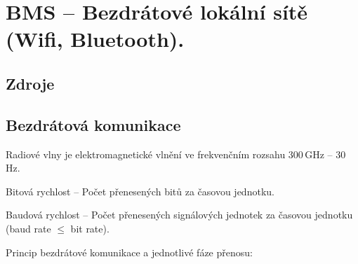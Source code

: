 

\graphicspath{{bms/bezdratove_lokalni_site/figures}}


\chapter{BMS -- Bezdrátové lokální sítě (Wifi, Bluetooth).}



\section{Zdroje}

\begin{compactitem}
    \item {}
    \item {} %
    \item {}
\end{compactitem}


\section{Bezdrátová komunikace}

\begin{compactitem}
    \item Radiové vlny je elektromagnetické vlnění ve frekvenčním rozsahu 300\,GHz -- 30\,Hz.
    \item Bitová rychlost -- Počet přenesených bitů za časovou jednotku.
    \item Baudová rychlost -- Počet přenesených signálových jednotek za časovou jednotku (baud rate $\leq$ bit rate).
    \item Princip bezdrátové komunikace a jednotlivé fáze přenosu:
\end{compactitem}

